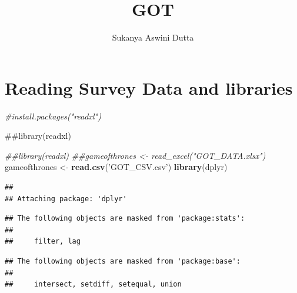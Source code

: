 \documentclass[]{article}
\title{GOT}
\author{Sukanya Aswini Dutta}
\date{}
\newenvironment{Shaded}{\begin{snugshade}}{\end{snugshade}}
\newcommand{\CommentTok}[1]{\textcolor[rgb]{0.56,0.35,0.01}{\textit{#1}}}
\newcommand{\KeywordTok}[1]{\textcolor[rgb]{0.13,0.29,0.53}{\textbf{#1}}}
\newcommand{\NormalTok}[1]{#1}
\newcommand{\StringTok}[1]{\textcolor[rgb]{0.31,0.60,0.02}{#1}}
\begin{document}
\maketitle

\hypertarget{reading-survey-data-and-libraries}{%
\section{Reading Survey Data and
libraries}\label{reading-survey-data-and-libraries}}

\begin{Shaded}
\begin{Highlighting}[]
\CommentTok{#install.packages("readxl")}
\end{Highlighting}
\end{Shaded}

\#\#library(readxl)

\begin{Shaded}
\begin{Highlighting}[]
\CommentTok{##library(readxl)}
\CommentTok{##gameofthrones <- read_excel("GOT_DATA.xlsx")}
\NormalTok{gameofthrones <-}\StringTok{ }\KeywordTok{read.csv}\NormalTok{(}\StringTok{'GOT_CSV.csv'}\NormalTok{)}
\KeywordTok{library}\NormalTok{(dplyr)}
\end{Highlighting}
\end{Shaded}

\begin{verbatim}
## 
## Attaching package: 'dplyr'
\end{verbatim}

\begin{verbatim}
## The following objects are masked from 'package:stats':
## 
##     filter, lag
\end{verbatim}

\begin{verbatim}
## The following objects are masked from 'package:base':
## 
##     intersect, setdiff, setequal, union
\end{verbatim}

\begin{Shaded}
\end{Shaded}
\end{document}
